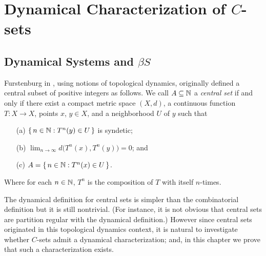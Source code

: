 
\newcommand{\ds}{(X, \la T_s \ra_{s \in S})}
\chapter{Dynamical Characterization of $C$-sets}
\section{Dynamical Systems and $\beta S$}
Furstenburg in \cite[Chapter 8]{Furstenberg:1981fk}, using notions of topological dynamics, originally defined a central subset of positive integers as follows. 
We call $A \subseteq \mathbb{N}$ a \emph{central set} if and only if there exist a compact metric space $(X, d)$, a continuous function $T \colon X \to X$, points $x$, $y \in X$, and a neighborhood $U$ of $y$ such that
\begin{itemize}
  \item[(a)]
    $\{\, n \in \mathbb{N} : T^n(y) \in U \,\}$ is syndetic;

  \item[(b)]
    $\displaystyle\lim_{n\to\infty} d\bigl(T^n(x), T^n(y) \bigr) = 0$; and

  \item[(c)]
    $A = \{\, n \in \mathbb{N} : T^n(x) \in U \,\}$. 
\end{itemize}
Where for each $n \in \mathbb{N}$, $T^n$ is the composition of $T$ with itself $n$-times.

The dynamical definition for central sets is simpler than the combinatorial definition but it is still nontrivial. 
(For instance, it is not obvious that central sets are partition regular with the dynamical definition.)
However since central sets originated in this topological dynamics context, it is natural to investigate whether $C$-sets admit a dynamical characterization; and, in this chapter we prove that such a characterization exists. 

